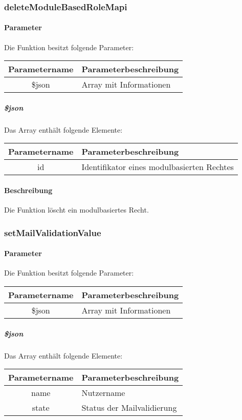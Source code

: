 \subsubsection{deleteModuleBasedRoleMapi}
\paragraph{Parameter} Die Funktion besitzt folgende Parameter:
\begin{table}[H]
	\begin{tabular}{|c|p{11cm}|}
		\hline
		\textbf{Parametername} & \textbf{Parameterbeschreibung} \\ \hline
		\$json & Array mit Informationen \\ \hline
	\end{tabular}
\end{table}
\subparagraph{\$json}Das Array enthält folgende Elemente:
\begin{table}[H]
	\begin{tabular}{|c|p{11cm}|}
		\hline
		\textbf{Parametername} & \textbf{Parameterbeschreibung} \\ \hline
		id     & Identifikator eines modulbasierten Rechtes \\ \hline
	\end{tabular}
\end{table}
\paragraph{Beschreibung} Die Funktion löscht ein modulbasiertes Recht.
\subsubsection{setMailValidationValue}
\paragraph{Parameter} Die Funktion besitzt folgende Parameter:
\begin{table}[H]
	\begin{tabular}{|c|p{11cm}|}
		\hline
		\textbf{Parametername} & \textbf{Parameterbeschreibung} \\ \hline
		\$json & Array mit Informationen \\ \hline
	\end{tabular}
\end{table}
\subparagraph{\$json}Das Array enthält folgende Elemente:
\begin{table}[H]
	\begin{tabular}{|c|p{11cm}|}
		\hline
		\textbf{Parametername} & \textbf{Parameterbeschreibung} \\ \hline
		name     & Nutzername \\ \hline
		state    & Status der Mailvalidierung \\ \hline
	\end{tabular}
\end{table}
